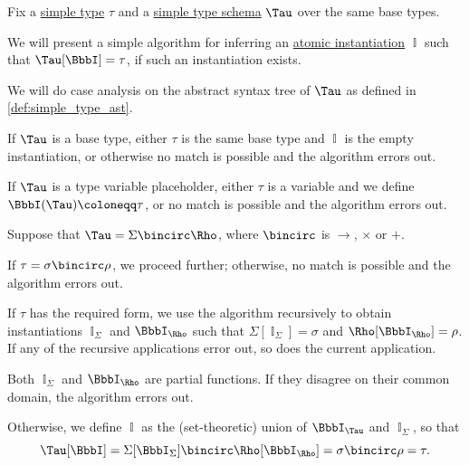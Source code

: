 \begin{algorithm}\label{alg:simple_type_schema_inference}
  Fix a \hyperref[def:simple_type]{simple type} \( \tau \) and a \hyperref[def:simple_type_schema]{simple type schema} \( \Tau \) over the same base types.

  We will present a simple algorithm for inferring an \hyperref[def:atomic_lambda_instantiation]{atomic instantiation} \( \BbbI \) such that \( \Tau[\BbbI] = \tau \), if such an instantiation exists.

  We will do case analysis on the abstract syntax tree of \( \Tau \) as defined in \cref{def:simple_type_ast}.
  \begin{thmenum}
     If \( \Tau \) is a base type, either \( \tau \) is the same base type and \( \BbbI \) is the empty instantiation, or otherwise no match is possible and the algorithm errors out.

     If \( \Tau \) is a type variable placeholder, either \( \tau \) is a variable and we define \( \BbbI(\Tau) \coloneqq \tau \), or no match is possible and the algorithm errors out.

     Suppose that \( \Tau = \Sigma \bincirc \Rho \), where \( {\bincirc} \) is \( {\rightarrow} \), \( {\times} \) or \( {+} \).

    If \( \tau = \sigma \bincirc \rho \), we proceed further; otherwise, no match is possible and the algorithm errors out.

    If \( \tau \) has the required form, we use the algorithm recursively to obtain instantiations \( \BbbI_\Sigma \) and \( \BbbI_\Rho \) such that \( \Sigma[\BbbI_\Sigma] = \sigma \) and \( \Rho[\BbbI_\Rho] = \rho \). If any of the recursive applications error out, so does the current application.

    Both \( \BbbI_\Sigma \) and \( \BbbI_\Rho \) are partial functions. If they disagree on their common domain, the algorithm errors out.

    Otherwise, we define \( \BbbI \) as the (set-theoretic) union of \( \BbbI_\Tau \) and \( \BbbI_\Sigma \), so that
    \begin{equation*}
      \Tau[\BbbI] = \Sigma[\BbbI_\Sigma] \bincirc \Rho[\BbbI_\Rho] = \sigma \bincirc \rho = \tau.
    \end{equation*}
  \end{thmenum}
\end{algorithm}
